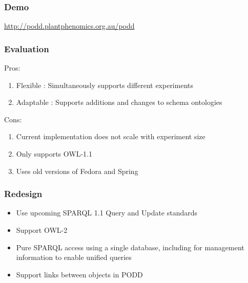 \documentclass[12pt]{beamer}
\begin{document}
\bgroup
{}
\begin{frame}[plain]{}
\end{frame}
\egroup

\begin{frame}
\frametitle{Demo} 

\url{http://podd.plantphenomics.org.au/podd}

\end{frame}

\begin{frame}
\frametitle{Evaluation}

Pros:

\begin{enumerate}
 \item Flexible : Simultaneously supports different experiments
 \item Adaptable : Supports additions and changes to schema ontologies
\end{enumerate}

Cons:

\begin{enumerate}
 \item Current implementation does not scale with experiment size
 \item Only supports OWL-1.1
 \item Uses old versions of Fedora and Spring
\end{enumerate}


\end{frame}

\begin{frame}
\frametitle{Redesign}

\begin{itemize}
 \item Use upcoming SPARQL 1.1 Query and Update standards
 \item Support OWL-2
 \item Pure SPARQL access using a single database, including for management information to enable unified queries
 \item Support links between objects in PODD
\end{itemize}


\end{frame}
\end{document}

